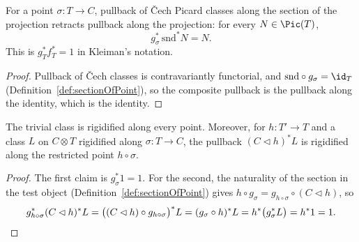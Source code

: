 \begin{lemma}
  \label{lem:cechPicMap_sectionOfPoint_snd}
  \leanok
  For a point \(\sigma \colon T \to C\), pullback of \v Cech Picard classes along the section
  of the projection retracts pullback along the projection: for every \(N \in \Pic(T)\),
  \[
    g_\sigma^{*}\,\mathrm{snd}^{*} N = N .
  \]
  This is \(g_T^{*} f_T^{*} = 1\) in Kleiman's notation.
\end{lemma}
\begin{proof}
  \leanok
  Pullback of \v Cech classes is contravariantly functorial, and \(\mathrm{snd} \circ
  g_\sigma = \id_T\) (Definition~\ref{def:sectionOfPoint}), so the composite pullback is the
  pullback along the identity, which is the identity.
\end{proof}

\begin{lemma}
  \label{lem:isRigidified_cechPicMap}
  \leanok
  The trivial class is rigidified along every point. Moreover, for \(h \colon T' \to T\) and a
  class \(L\) on \(C \otimes T\) rigidified along \(\sigma \colon T \to C\), the pullback
  \((C \lhd h)^{*} L\) is rigidified along the restricted point \(h \circ \sigma\).
\end{lemma}
\begin{proof}
  \leanok
  The first claim is \(g_\sigma^{*} 1 = 1\). For the second, the naturality of the section in
  the test object (Definition~\ref{def:sectionOfPoint}) gives \(h \circ g_\sigma =
  g_{h \circ \sigma} \circ (C \lhd h)\), so
  \[
    g_{h \circ \sigma}^{*} (C \lhd h)^{*} L
      = \bigl((C \lhd h) \circ g_{h \circ \sigma}\bigr)^{*} L
      = (g_\sigma \circ h)^{*} L
      = h^{*} \bigl(g_\sigma^{*} L\bigr) = h^{*} 1 = 1 . \qedhere
  \]
\end{proof}

